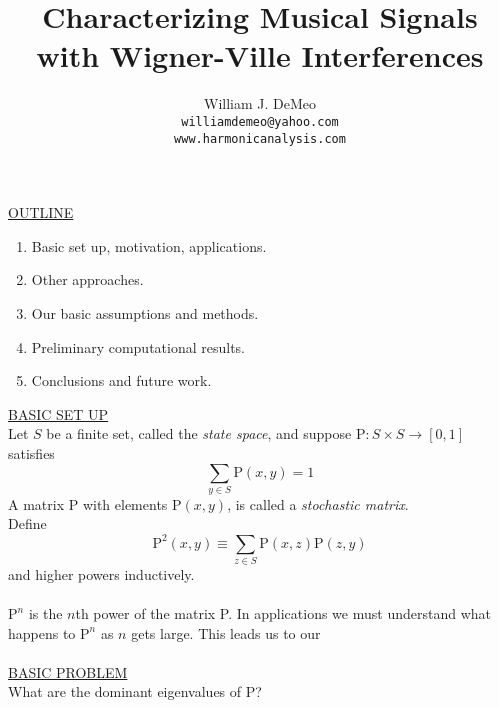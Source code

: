 \documentclass{slides}
\newcommand{\Prob}{\mbox{P}}
\begin{document}
%
\title{\textbf{Characterizing Musical Signals 
with Wigner-Ville Interferences}}
\author{William J. DeMeo\\
\vspace{3mm}
{\small {\tt williamdemeo@yahoo.com}}
\\
\vspace{2cm}
{\tt www.harmonicanalysis.com}
}
\date{}
\maketitle

\begin{slide}
\underline{OUTLINE}
\begin{enumerate}
\item Basic set up, motivation, applications.
\item Other approaches.
\item Our basic assumptions and methods.
\item Preliminary computational results.
\item Conclusions and future work.
\end{enumerate}
\end{slide}

\begin{slide}
\underline{BASIC SET UP}\\
Let $S$ be a finite set, called the {\it state space}, 
and suppose $\Prob:S \times S \rightarrow [0,1]$ satisfies 
\begin{equation}
\label{StochasticMatrix} 
\sum_{y\in S}\Prob(x,y)=1
\end{equation}
A matrix P with elements $\Prob(x,y)$, is called a \emph{stochastic matrix}.
\\
Define 
\[\Prob^2(x,y) \equiv \sum_{z\in S} \Prob(x,z)\Prob(z,y)\]
and higher powers inductively.
\\\\
$\Prob^n$ is the $n$th power of the matrix P.  
In applications we must understand what happens to $\Prob^n$ as $n$ gets large.
This leads us to our \\\\
\underline{BASIC PROBLEM}
\\
What are the dominant eigenvalues of P?
\end{slide}
\end{document}

